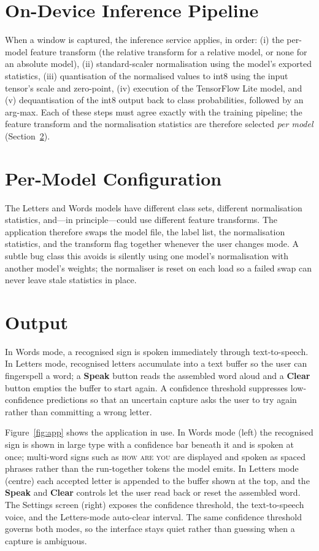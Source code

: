 \section{On-Device Inference Pipeline}

When a window is captured, the inference service applies, in order: (i) the
per-model feature transform (the relative transform for a relative model, or
none for an absolute model), (ii) standard-scaler normalisation using the
model's exported statistics, (iii) quantisation of the normalised values to
int8 using the input tensor's scale and zero-point, (iv) execution of the
TensorFlow Lite model, and (v) dequantisation of the int8 output back to class
probabilities, followed by an arg-max. Each of these steps must agree exactly
with the training pipeline; the feature transform and the normalisation
statistics are therefore selected \emph{per model} (Section~\ref{sec:permodel}).

\section{Per-Model Configuration}\label{sec:permodel}

The Letters and Words models have different class sets, different normalisation
statistics, and—in principle—could use different feature transforms. The
application therefore swaps the model file, the label list, the normalisation
statistics, and the transform flag together whenever the user changes mode. A
subtle bug class this avoids is silently using one model's normalisation with
another model's weights; the normaliser is reset on each load so a failed swap
can never leave stale statistics in place.

\section{Output}

In Words mode, a recognised sign is spoken immediately through text-to-speech.
In Letters mode, recognised letters accumulate into a text buffer so the user
can fingerspell a word; a \textbf{Speak} button reads the assembled word aloud
and a \textbf{Clear} button empties the buffer to start again. A confidence
threshold suppresses low-confidence predictions so that an uncertain capture
asks the user to try again rather than committing a wrong letter.

Figure~\ref{fig:app} shows the application in use. In Words mode (left) the
recognised sign is shown in large type with a confidence bar beneath it and is
spoken at once; multi-word signs such as \textsc{how are you} are displayed and
spoken as spaced phrases rather than the run-together tokens the model emits. In
Letters mode (centre) each accepted letter is appended to the buffer shown at the
top, and the \textbf{Speak} and \textbf{Clear} controls let the user read back
or reset the assembled word. The Settings screen (right) exposes the confidence
threshold, the text-to-speech voice, and the Letters-mode auto-clear interval.
The same confidence threshold governs both modes, so the interface stays quiet
rather than guessing when a capture is ambiguous.

